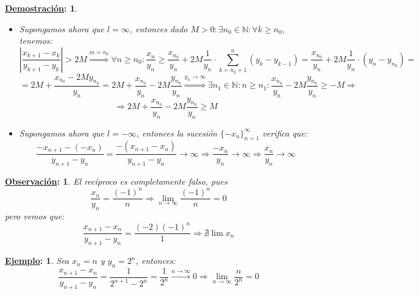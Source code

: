 \documentclass[10pt,a4paper,openright]{book}
\theoremstyle{break}
\newtheorem*{demo}{\underline{Demostración}:}
\newtheorem*{obs}{\underline{Observación}:}
\newtheorem*{ej}{\underline{Ejemplo}:}
\begin{document}
\begin{demo}
\begin{itemize}
\item Supongamos ahora que $l=\infty$, entonces dado $M>0: \exists n_0\in \mathbb N: \forall k\geq n_0$, tenemos:
$$\left|\frac{x_{k+1}-x_{k}}{y_{k+1}-y_k}\right|>2M\stackrel{m=n_0}{\Rightarrow} \forall n\geq n_0: \frac{x_n}{y_n}\geq \frac{x_{n_0}}{y_n}+ 2M\frac{1}{y_n}\cdot \sum_{k=n_0+1}^n (y_k-y_{k-1})=\frac{x_{n_0}}{y_n}+ 2M\frac{1}{y_n}\cdot (y_n-y_{n_0})=$$
$$=2M + \frac{x_{n_0}-2My_{n_0}}{y_n}=2M + \frac{x_{n_0}}{y_n}-2M\frac{y_{n_0}}{y_n}\stackrel{y_n\rightarrow \infty}{\Rightarrow} \exists n_1\in \mathbb N: n\geq n_1: \frac{x_{n_0}}{y_n}-2M\frac{y_{n_0}}{y_n}\geq -M\Rightarrow $$
$$\Rightarrow 2M + \frac{x_{n_0}}{y_n}-2M\frac{y_{n_0}}{y_n}\geq M$$

\item Supongamos ahora que $l=-\infty$, entonces la sucesión $\{-x_n\}_{n=1}^\infty$ verifica que:
$$\frac{-x_{n+1}-(-x_n)}{y_{n+1}-y_n}=\frac{-(x_{n+1}-x_n)}{y_{n+1}-y_n} \rightarrow\infty \Rightarrow \frac{-x_n}{y_n}\rightarrow \infty\Rightarrow \frac{x_n}{y_n}\rightarrow \infty$$
\end{itemize}
\end{demo}

\begin{obs}
El recíproco es completamente falso, pues
$$\frac{x_n}{y_n}=\frac{(-1)^n}{n}\Rightarrow \lim_{n\rightarrow \infty} \frac{(-1)^n}{n}=0$$
pero vemos que:
$$\frac{x_{n+1}-x_n}{y_{n+1}-y_n}=\frac{(-2)(-1)^n}{1}\Rightarrow \nexists \lim x_n$$
\end{obs}

\begin{ej}
Sea $x_n=n$ y $y_n=2^n$, entonces:
$$\frac{x_{n+1}-x_n}{y_{n+1}-y_n}=\frac{1}{2^{n+1}-2^n}=\frac{1}{2^n}\stackrel{n\rightarrow \infty}{\rightarrow} 0\Rightarrow \lim_{n\rightarrow \infty}\frac{n}{2^n}=0$$
\end{ej}
\end{document}
